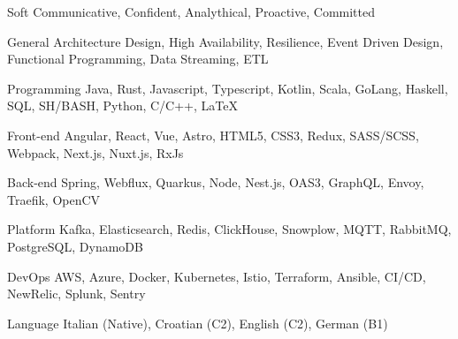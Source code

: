 
\begin{cvskills}

  \cvskill
    {Soft} %
    {Communicative, Confident, Analythical, Proactive, Committed} %

  \cvskill
    {General} %
    {Architecture Design, High Availability, Resilience, Event Driven Design, Functional Programming, Data Streaming, ETL} %

  \cvskill
    {Programming} %
    {Java, Rust, Javascript, Typescript, Kotlin, Scala, GoLang, Haskell, SQL, SH/BASH, Python, C/C++, LaTeX} %

  \cvskill
    {Front-end} %
    {Angular, React, Vue, Astro, HTML5, CSS3, Redux, SASS/SCSS, Webpack, Next.js, Nuxt.js, RxJs} %
    
  \cvskill
    {Back-end} %
    {Spring, Webflux, Quarkus, Node, Nest.js, OAS3, GraphQL, Envoy, Traefik, OpenCV} %

  \cvskill
    {Platform} %
    {Kafka, Elasticsearch, Redis, ClickHouse, Snowplow, MQTT, RabbitMQ, PostgreSQL, DynamoDB} %

  \cvskill
    {DevOps} %
    {AWS, Azure, Docker, Kubernetes, Istio, Terraform, Ansible, CI/CD, NewRelic, Splunk, Sentry} %

  \cvskill
    {Language} %
    {Italian (Native), Croatian (C2), English (C2), German (B1)} %

\end{cvskills}
